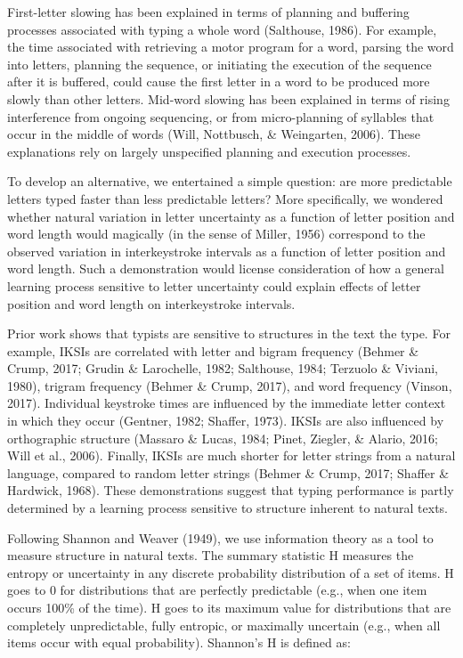 \documentclass[,man,floatsintext]{apa6}
\begin{document}
First-letter slowing has been explained in terms of planning and buffering processes associated with typing a whole word (Salthouse, 1986). For example, the time associated with retrieving a motor program for a word, parsing the word into letters, planning the sequence, or initiating the execution of the sequence after it is buffered, could cause the first letter in a word to be produced more slowly than other letters. Mid-word slowing has been explained in terms of rising interference from ongoing sequencing, or from micro-planning of syllables that occur in the middle of words (Will, Nottbusch, \& Weingarten, 2006). These explanations rely on largely unspecified planning and execution processes.

To develop an alternative, we entertained a simple question: are more predictable letters typed faster than less predictable letters? More specifically, we wondered whether natural variation in letter uncertainty as a function of letter position and word length would magically (in the sense of Miller, 1956) correspond to the observed variation in interkeystroke intervals as a function of letter position and word length. Such a demonstration would license consideration of how a general learning process sensitive to letter uncertainty could explain effects of letter position and word length on interkeystroke intervals.

Prior work shows that typists are sensitive to structures in the text the type. For example, IKSIs are correlated with letter and bigram frequency (Behmer \& Crump, 2017; Grudin \& Larochelle, 1982; Salthouse, 1984; Terzuolo \& Viviani, 1980), trigram frequency (Behmer \& Crump, 2017), and word frequency (Vinson, 2017). Individual keystroke times are influenced by the immediate letter context in which they occur (Gentner, 1982; Shaffer, 1973). IKSIs are also influenced by orthographic structure (Massaro \& Lucas, 1984; Pinet, Ziegler, \& Alario, 2016; Will et al., 2006). Finally, IKSIs are much shorter for letter strings from a natural language, compared to random letter strings (Behmer \& Crump, 2017; Shaffer \& Hardwick, 1968). These demonstrations suggest that typing performance is partly determined by a learning process sensitive to structure inherent to natural texts.

Following Shannon and Weaver (1949), we use information theory as a tool to measure structure in natural texts. The summary statistic H measures the entropy or uncertainty in any discrete probability distribution of a set of items. H goes to 0 for distributions that are perfectly predictable (e.g., when one item occurs 100\% of the time). H goes to its maximum value for distributions that are completely unpredictable, fully entropic, or maximally uncertain (e.g., when all items occur with equal probability). Shannon's H is defined as:
\end{document}
